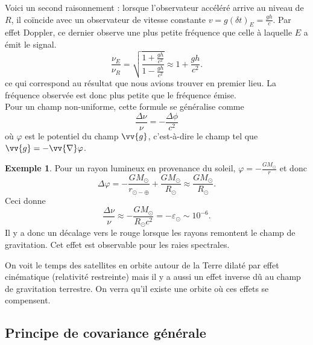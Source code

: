 \documentclass[a4paper,11pt]{report}
\theoremstyle{definition}
\theoremstyle{plain}
\theoremstyle{definition}
\newtheorem{exmp}{Exemple}[chapter]
\theoremstyle{remark}
\begin{document}
                Voici un second raisonnement : lorsque l'observateur accéléré arrive au niveau de $R$, il coïncide avec un observateur de vitesse constante $v = g(\delta t)_E = \frac{gh}{c}$. Par effet Doppler, ce dernier observe une plus petite fréquence que celle à laquelle $E$ a émit le signal.
                \begin{equation}
                    \frac{\nu_E}{\nu_R} = \sqrt{\frac{1+\frac{gh}{c^2}}{1-\frac{gh}{c^2}}}\approx 1+\frac{gh}{c^2}.
                \end{equation}
                ce qui correspond au résultat que nous avions trouver en premier lieu. La fréquence observée est donc plus petite que le fréquence émise.\\
                Pour un champ non-uniforme, cette formule se généralise comme
                \begin{equation}
                    \frac{\Delta\nu}{\nu} = -\frac{\Delta\phi}{c^2}
                \end{equation}
                où $\varphi$ est le potentiel du champ $\vv{g}$, c'est-à-dire le champ tel que $\vv{g} = -\vv{\nabla}\varphi$.
                
                \begin{exmp}
                    Pour un rayon lumineux en provenance du soleil, $\varphi=-\frac{GM_\odot}{r}$ et donc
                    \begin{equation}
                        \Delta\varphi = -\frac{GM_\odot}{r_{\odot-\oplus}} + \frac{GM_\odot}{R_\odot}\approx\frac{GM_\odot}{R_\odot}.
                    \end{equation}
                    Ceci donne
                    \begin{equation}
                        \frac{\Delta\nu}{\nu} \approx - \frac{GM_\odot}{R_\odot c^2} = -\varepsilon_\odot \sim 10^{-6}.
                    \end{equation}
                    Il y a donc un décalage vers le rouge lorsque les rayons remontent le champ de gravitation. Cet effet est observable pour les raies spectrales.
                \end{exmp}
                
                On voit le temps des satellites en orbite autour de la Terre dilaté par effet cinématique (relativité restreinte) mais il y a aussi un effet inverse dû au champ de gravitation terrestre. On verra qu'il existe une orbite où ces effets se compensent.
    
        \subsection{Principe de covariance générale}
        
\end{document}
